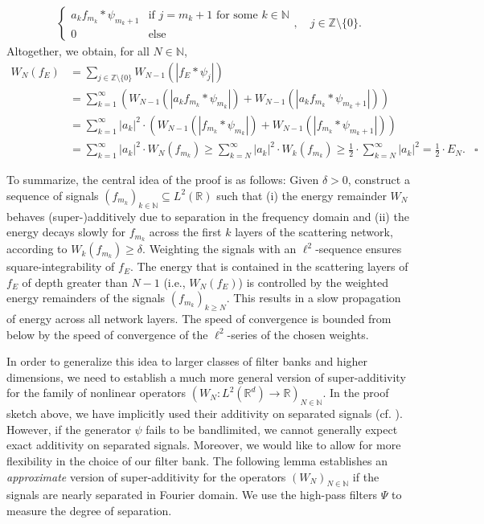 \documentclass[11pt]{amsart}
\newcommand{\R}{{\mathbb{R}}}
\newcommand{\N}{\mathbb{N}}
\newcommand{\Z}{\mathbb{Z}}
\newenvironment{proof sketch} {\textit{Proof sketch.}}{}
\begin{document}
\begin{proof sketch}
\begin{align*}
\begin{cases}
      a_k f_{m_k}*\psi_{m_k+1} & \text{if } j=m_k+1 \text{ for some } k \in \N \\
      0 &\text{else}
    \end{cases}, \quad j \in \Z\setminus \{0\}.
  \end{align*}
  Altogether, we obtain, for all $N \in \N$,\enlargethispage*{15mm}
  \begin{align*}
    W_{N}(f_E)&=\sum_{j \in \Z \setminus \{0\}} W_{N-1}(|f_E*\psi_j|) \\
    &=\sum_{k=1}^\infty \left(W_{N-1}(|a_kf_{m_k}*\psi_{m_k}|) + W_{N-1}(|a_kf_{m_k}*\psi_{m_k+1}|)\right) \\
    &=\sum_{k=1}^\infty |a_k|^2 \cdot \left(W_{N-1}(|f_{m_k}*\psi_{m_k}|) + W_{N-1}(|f_{m_k}*\psi_{m_k+1}|)\right)\\
    &= \sum_{k=1}^\infty |a_k|^2 \cdot W_{N}(f_{m_k})
    \geq \sum_{k=N}^\infty |a_k|^2 \cdot W_{k}(f_{m_k}) 
    \geq \frac{1}{2} \cdot \sum_{k=N}^\infty |a_k|^2 = \frac{1}{2} \cdot E_N. &\square
  \end{align*}
  \end{proof sketch}
  
  To summarize, the central idea of the proof is as follows: Given $\delta>0$, construct a sequence of signals $(f_{m_k})_{k \in \N} \subseteq L^2(\R)$ such that (i) the energy remainder $W_N$ behaves (super-)additively due to separation in the frequency domain and (ii) the energy decays slowly for $f_{m_k}$ across the first $k$ layers of the scattering network, according to $W_k(f_{m_k})\geq \delta$. Weighting the signals with an $\ell^2$-sequence ensures square-integrability of $f_E$. The energy that is contained in the scattering layers of $f_E$ of depth greater than $N-1$ (i.e., $W_N(f_E)$) is controlled by the weighted energy remainders of the signals $(f_{m_k})_{k \geq N}$. This results in a slow propagation of energy across all network layers. The speed of convergence is bounded from below by the speed of convergence of the $\ell^2$-series of the chosen weights.  
  
  In order to generalize this idea to larger classes of filter banks and higher dimensions, we need to establish a much more general version of super-additivity for the family of nonlinear operators $(W_N:L^2(\R^d)\to \R)_{N \in \N}$. In the proof sketch above, we have implicitly used their additivity on separated signals (cf. \cite[Lemma 2.3]{nicola2023stability}). However, if the generator $\psi$ fails to be bandlimited, we cannot generally expect exact additivity on separated signals. Moreover, we would like to allow for more flexibility in the choice of our filter bank. The following lemma establishes an \textit{approximate} version of super-additivity for the operators $(W_N)_{N \in \N}$ if the signals are nearly separated in Fourier domain. We use the high-pass filters $\Psi$ to measure the degree of separation.
  
\end{document}
